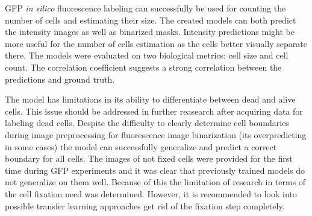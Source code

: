 GFP \textit{in silico} fluorescence labeling can successfully be used for counting the number of cells and estimating their size. The created models can both predict the intensity images as well as binarized masks. Intensity predictions might be more useful for the number of cells estimation as the cells better visually separate there. The models were evaluated on two biological metrics: cell size and cell count. The correlation coefficient suggests a strong correlation between the predictions and ground truth. 

The model has limitations in its ability to differentiate between dead and alive cells. This issue should be addressed in further reasearch after acquiring data for labeling dead cells. Despite the difficulty to clearly determine cell boundaries during image preprocessing for fluorescence image binarization (its overpredicting in some cases) the model can successfully generalize and predict a correct boundary for all cells. The images of not fixed cells were provided for the first time during GFP experiments and it was clear that previously trained models do not generalize on them well.  Because of this the limitation of research in terms of the cell fixation need was determined. However, it is recommended to look into possible transfer learning approaches get rid of the fixation step completely.
  
